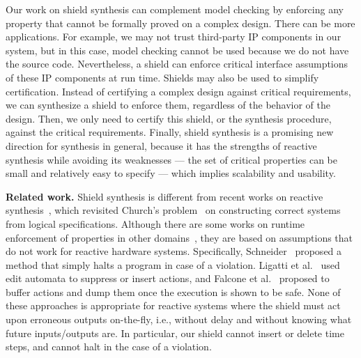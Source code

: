 \documentclass{llncs}
\begin{document}
Our work on shield synthesis can complement model checking by enforcing 
any property that cannot be formally proved on a complex design.  There 
can be more applications.  For example, we may not trust third-party IP 
components in our system, but in this case, model checking cannot be 
used because we do not have the source code. Nevertheless, a shield can 
enforce critical interface assumptions of these IP components at run 
time.
Shields may also be used to simplify certification.  Instead of 
certifying a complex design against critical requirements, we can 
synthesize a shield to enforce them, regardless of the behavior of the 
design.  Then, we only need to certify this shield, or the synthesis 
procedure, against the critical requirements.
Finally, shield synthesis is a promising new direction for synthesis in 
general, because it has the strengths of reactive synthesis while 
avoiding its weaknesses --- the set of critical properties can be small 
and relatively easy to specify --- which implies scalability and 
usability.


\noindent \textbf{Related work.}  
Shield synthesis is different from recent works on reactive 
synthesis~\cite{Pnueli89,BloemJPPS12,EhlersT14}, which revisited 
Church's problem~\cite{Church63,Buchi69,Rabin72} on constructing correct 
systems from logical specifications. Although there are some works on 
runtime enforcement of properties in other 
domains~\cite{Schneider00,LigattiBW09,FalconeFM12}, they are based on 
assumptions that do not work for reactive hardware systems. 
Specifically, Schneider~\cite{Schneider00} proposed a method that simply 
halts a program in case of a violation.  Ligatti et 
al.~\cite{LigattiBW09} used edit automata to suppress or insert actions, 
and Falcone et al.~\cite{FalconeFM12} proposed to buffer actions and 
dump them once the execution is shown to be safe. None of these 
approaches is appropriate for reactive systems where the shield must act 
upon erroneous outputs on-the-fly, i.e., without delay and without 
knowing what future inputs/outputs are.  In particular, our shield 
cannot insert or delete time steps, and cannot halt in the case 
of a violation.
\end{document}
